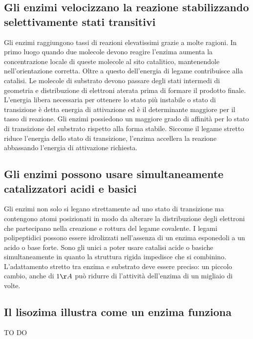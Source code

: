 \subsection{Gli enzimi velocizzano la reazione stabilizzando selettivamente stati transitivi}
Gli enzimi raggiungono tassi di reazioni elevatissimi grazie a molte ragioni. In primo luogo quando due molecole devono reagire l'enzima aumenta la concentrazione locale di queste 
molecole al sito catalitico, mantenendole nell'orientazione corretta. Oltre a questo dell'energia di legame contribuisce alla catalisi. Le molecole di substrato devono passare degli 
stati intermedi di geometria e distribuzione di elettroni aterata prima di formare il prodotto finale. L'energia libera necessaria per ottenere lo stato pi\`u instabile o stato di
transizione \`e detta energia di attivazione ed \`e il determinante maggiore per il tasso di reazione. Gli enzimi possiedono un maggiore grado di affinit\`a per lo stato di transizione
del substrato rispetto alla forma stabile. Siccome il legame stretto riduce l'energia dello stato di transizione, l'enzima accellera la reazione abbassando l'energia di attivazione 
richiesta.
\subsection{Gli enzimi possono usare simultaneamente catalizzatori acidi e basici}
Gli enzimi non solo si legano strettamente ad uno stato di transizione ma contengono atomi posizionati in modo da alterare la distribuzione degli elettroni che partecipano nella 
creazione e rottura del legame covalente. I legami polipeptidici possono essere idrolizzati nell'assenza di un enzima esponedoli a un acido o base forte. Sono gli unici a poter usare 
catalisi acide o basiche simultaneamente in quanto la struttura rigida impedisce che si combinino. L'adattamento stretto tra enzima e substrato deve essere preciso: un piccolo cambio, 
anche di $1\AA$ pu\`o ridurre di l'attivit\`a dell'enzima di un migliaio di volte.
\subsection{Il lisozima illustra come un enzima funziona}





\begin{Huge}
	TO DO
\end{Huge}
